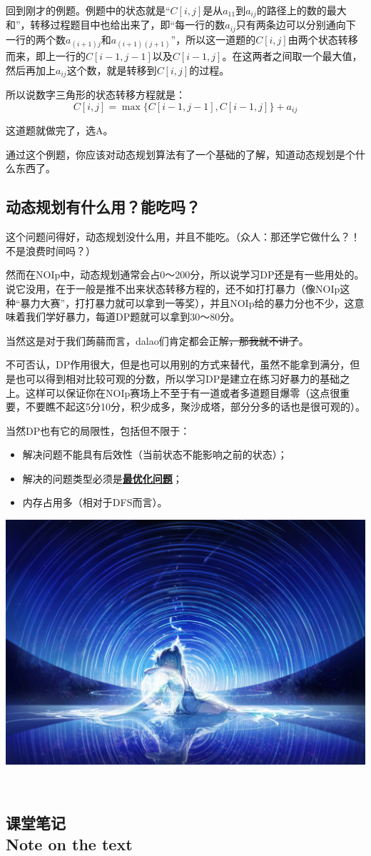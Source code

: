\documentclass{article}
\theoremstyle{nonumberplain}
\newcommand{\note}{\ \par
	\subsection*{课堂笔记\\\tiny{Note on the text}}
	\newpage}
\begin{document}
回到刚才的例题。例题中的状态就是“$C[i,j]$是从$a_{11}$到$a_{ij}$的路径上的数的最大和”，转移过程题目中也给出来了，即“每一行的数$a_{ij}$只有两条边可以分别通向下一行的两个数$a_{(i+1)j}$和$a_{(i+1)(j+1)}$”，所以这一道题的$C[i,j]$由两个状态转移而来，即上一行的$C[i-1,j-1]$以及$C[i-1,j]$。在这两者之间取一个最大值，然后再加上$a_{ij}$这个数，就是转移到$C[i,j]$的过程。

所以说数字三角形的状态转移方程就是：
\begin{equation*}
	C[i,j]=\max\{C[i-1,j-1],C[i-1,j]\}+a_{ij}
\end{equation*}

这道题就做完了，选A。

通过这个例题，你应该对动态规划算法有了一个基础的了解，知道动态规划是个什么东西了。
\subsection{动态规划有什么用？能吃吗？}
这个问题问得好，动态规划没什么用，并且不能吃。（众人：那还学它做什么？！不是浪费时间吗？）

然而在NOIp中，动态规划通常会占0～200分，所以说学习DP还是有一些用处的。说它没用，在于一般是推不出来状态转移方程的，还不如打打暴力（像NOIp这种“暴力大赛”，打打暴力就可以拿到一等奖），并且NOIp给的暴力分也不少，这意味着我们学好暴力，每道DP题就可以拿到30～80分。

当然这是对于我们蒟蒻而言，dalao们肯定都会正解\sout{，那我就不讲了}。

不可否认，DP作用很大，但是也可以用别的方式来替代，虽然不能拿到满分，但是也可以得到相对比较可观的分数，所以学习DP是建立在练习好暴力的基础之上。这样可以保证你在NOIp赛场上不至于有一道或者多道题目爆零（这点很重要，不要瞧不起这5分10分，积少成多，聚沙成塔，部分分多的话也是很可观的）。

当然DP也有它的局限性，包括但不限于：
\begin{itemize}
	\item{解决问题不能具有后效性（当前状态不能影响之前的状态）；}
	\item{解决的问题类型必须是\textbf{\underline{最优化问题}}；}
	\item{内存占用多（相对于DFS而言）。}
\end{itemize}

\begin{center}\includegraphics[scale=0.60]{38183202_p0.jpg}\end{center}
\note
\end{document}

